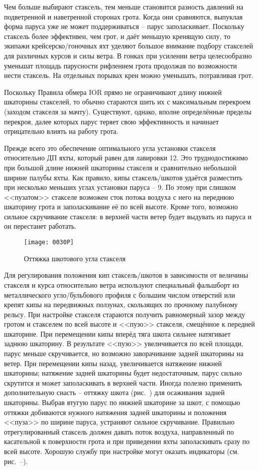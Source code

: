 Чем больше выбирают стаксель, тем меньше становится разность давлений
на подветренной и наветренной сторонах грота. Когда они сравняются,
выпуклая форма паруса уже не может поддерживаться \--- парус
заполаскивает. Поскольку стаксель более эффективен, чем грот, и даёт
меньшую кренящую силу, то экипажи крейсерско\-/гоночных яхт уделяют
большое внимание подбору стакселей для различных курсов и силы
ветра. В гонках при усилении ветра целесообразно уменьшат площадь
парусности рифлением грота продолжая по возможности нести стаксель. На
отдельных порывах крен можно уменьшать, потравливая грот.

Поскольку Правила обмера IOR прямо не ограничивают длину нижней
шкаторины стакселей, то обычно стараются шить их с максимальным
перекроем (заходом стакселя за мачту). Существуют, однако, вполне
определённые пределы перекроя, далее которых парус теряет свою
эффективность и начинает отрицательно влиять на работу грота.

Прежде всего это обеспечение оптимального угла установки стакселя
относительно ДП яхты, который равен для лавировки 12\gr. Это
труднодостижимо при большой длине нижней шкаторины стакселя и
сравнительно небольшой ширине палубы яхты. Как правило, кипы
стаксель\-/шкотов удаётся разместить при несколько меньших углах
установки паруса \--- 9\gr. По этому при слишком <<пузатом>>
стакселе возможен сток потока воздуха с него на переднюю шкаторину
грота и заполаскивание её по всей высоте. Кроме того, возможно сильное
скручивание стакселя: в верхней части ветер будет выдувать из паруса и
он перестанет работать.

\begin{figure}[!htb]
  \centering
  \texttt{[image: 0030P]}
  \caption{Оттяжка шкотового угла стакселя}
  \label{fig:30}
\end{figure}

Для регулирования положения кип стаксель\-/шкотов в зависимости от
величины стакселя и курса относительно ветра используют специальный
фальшборт из металлического угло\-/бульбового профиля с большим числом
отверстий или крепят кипы на передвижных ползунах, скользящих по
прочному палубному рельсу. При настройке стакселя стараются получить
равномерный зазор между гротом и стакселем по всей высоте и <<пузо>>
стакселя, смещённое к передней шкаторине. При перемещении кипы вперёд
тяга шкота сильнее натягивает заднюю шкаторину. В результате <<пузо>>
увеличивается по всей площади, парус меньше скручивается, но возможно
заворачивание задней шкаторины на ветер. При перемещении кипы назад,
увеличивается натяжение нижней шкаторины; натяжение задней шкаторины
будет недостаточным, парус сильно скрутится и может заполаскивать в
верхней части. Иногда полезно применить дополнительную снасть \---
оттяжку шкота (рис.~) для осаживания задней шкаторины. Выбрав
втугую парус по нижней шкаторине за шкот, с помощью оттяжки добиваются
нужного натяжения задней шкаторины и положения <<пуза>> по ширине
паруса, устраняют сильное скручивание. Правильно отрегулированный
стаксель должен давать поток воздуха, направленный по касательной к
поверхности грота и при приведении яхты заполаскивать сразу по всей
высоте. Хорошую службу при настройке могут оказать индикаторы
(см. рис.~--).


